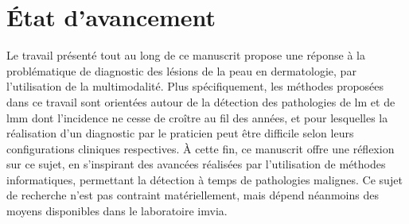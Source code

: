 \renewcommand{\thechapter}{\roman{chapter}}
\setcounter{chapter}{4}
\setcounter{figure}{0}

\label{chap:conclusion}

\section*{État d'avancement}
Le travail présenté tout au long de ce manuscrit propose une réponse à la problématique de diagnostic des lésions de la peau en dermatologie, par l'utilisation de la multimodalité. Plus spécifiquement, les méthodes proposées dans ce travail sont orientées autour de la détection des pathologies de \gls{lm} et de \gls{lmm} dont l'incidence ne cesse de croître au fil des années, et pour lesquelles la réalisation d'un diagnostic par le praticien peut être difficile selon leurs configurations cliniques respectives. À cette fin, ce manuscrit offre une réflexion sur ce sujet, en s'inspirant des avancées réalisées par l'utilisation de méthodes informatiques, permettant la détection à temps de pathologies malignes. Ce sujet de recherche n'est pas contraint matériellement, mais dépend néanmoins des moyens disponibles dans le laboratoire \gls{imvia}.\par

